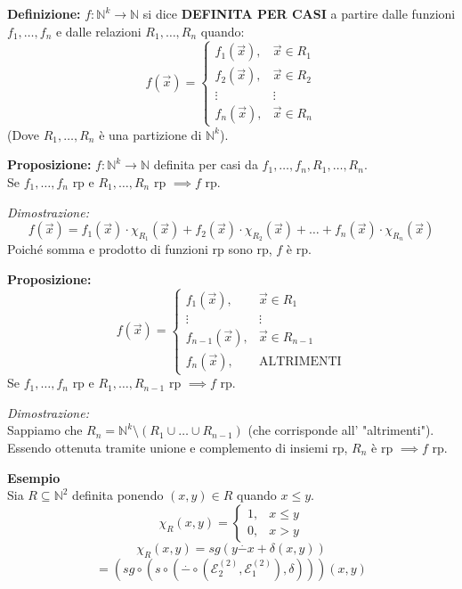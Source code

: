 \vspace{0.6cm}
\textbf{Definizione:} $f: \mathbb{N}^k \to \mathbb{N}$ si dice \textbf{DEFINITA PER CASI} a partire dalle funzioni $f_1, \dots, f_n$ e dalle relazioni $R_1, \dots, R_n$ quando:
$$
f(\vec{x}) = 
\begin{cases} 
f_1(\vec{x}), & \vec{x} \in R_1 \\ 
f_2(\vec{x}), & \vec{x} \in R_2 \\ 
\vdots & \vdots \\
f_n(\vec{x}), & \vec{x} \in R_n 
\end{cases}
$$
(Dove $R_1, \dots, R_n$ è una partizione di $\mathbb{N}^k$).

\vspace{0.4cm}
\textbf{Proposizione:} $f: \mathbb{N}^k \to \mathbb{N}$ definita per casi da $f_1, \dots, f_n, R_1, \dots, R_n$. \\
Se $f_1, \dots, f_n$ rp e $R_1, \dots, R_n$ rp $\implies f$ rp.

\textit{Dimostrazione:}
$$ f(\vec{x}) = f_1(\vec{x}) \cdot \chi_{R_1}(\vec{x}) + f_2(\vec{x}) \cdot \chi_{R_2}(\vec{x}) + \dots + f_n(\vec{x}) \cdot \chi_{R_n}(\vec{x}) $$
Poiché somma e prodotto di funzioni rp sono rp, $f$ è rp.

\vspace{0.4cm}
\textbf{Proposizione:}
$$
f(\vec{x}) = 
\begin{cases} 
f_1(\vec{x}), & \vec{x} \in R_1 \\ 
\vdots & \vdots \\
f_{n-1}(\vec{x}), & \vec{x} \in R_{n-1} \\
f_n(\vec{x}), & \text{ALTRIMENTI} 
\end{cases}
$$
Se $f_1, \dots, f_n$ rp e $R_1, \dots, R_{n-1}$ rp $\implies f$ rp.

\textit{Dimostrazione:} \\
Sappiamo che $R_n = \mathbb{N}^k \setminus (R_1 \cup \dots \cup R_{n-1})$ (che corrisponde all' "altrimenti"). 
Essendo ottenuta tramite unione e complemento di insiemi rp, $R_n$ è rp $\implies f$ rp.

\vspace{0.6cm}
\textbf{Esempio} \\
Sia $R \subseteq \mathbb{N}^2$ definita ponendo $(x,y) \in R$ quando $x \le y$.
$$
\chi_R(x,y) = 
\begin{cases} 
1, & x \le y \\ 
0, & x > y 
\end{cases}
$$
$$ \chi_R(x,y) = sg(y \overset{\cdot}{-} x + \delta(x,y)) $$
$$ = \left( sg \circ (s \circ (\overset{\cdot}{-} \circ (\mathcal{E}_2^{(2)}, \mathcal{E}_1^{(2)}), \delta)) \right)(x,y) $$

